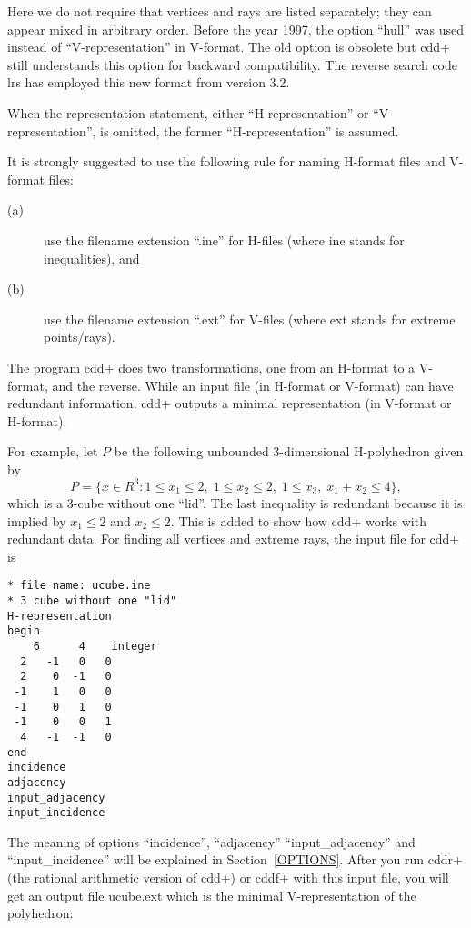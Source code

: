 \documentclass[11pt]{article}
\begin{document}
\bigskip
\noindent
Here we do not require that
vertices and rays are listed
separately; they can appear mixed in arbitrary
order.   Before the year 1997, 
the option ``hull'' was used instead of ``V-representation''
in V-format.  The old option is obsolete but cdd+ still
understands this option for backward compatibility.
The reverse search code lrs has employed this new format
from version 3.2.

When the representation statement, either ``H-representation''
or ``V-representation'', is omitted, the former
``H-representation'' is assumed.


It is strongly suggested to use the following rule for naming
H-format files and V-format files:   
\begin{description}
\item[(a)] use the filename  extension ``.ine'' for H-files (where ine stands for inequalities), and 
\item[(b)]  use the filename  extension ``.ext'' for V-files (where ext stands for extreme points/rays). 
\end{description}

The program cdd+ does two transformations, one from an H-format
to a V-format, and the reverse.    While an input file (in H-format or V-format)
can have redundant information, cdd+ outputs a minimal representation
(in V-format or H-format).

For example, let $P$ be the following unbounded 3-dimensional 
H-polyhedron given by
\[
   P = \{ x  \in R^3:
    1\le x_1 \le 2, \; 1 \le x_2 \le 2, \; 1 \le x_3,  \; x_1 + x_2 \le 4 \},
\]
which is a 3-cube without one ``lid''.   The last inequality is redundant
because it is implied by $x_1 \le 2$ and $x_2 \le 2$.  This is added
to show how cdd+ works with redundant data.
For finding all
vertices and extreme rays, the input file for cdd+ is

\begin{verbatim}
* file name: ucube.ine
* 3 cube without one "lid"
H-representation
begin
    6      4    integer
  2   -1   0   0
  2    0  -1   0
 -1    1   0   0
 -1    0   1   0
 -1    0   0   1
  4   -1  -1   0
end
incidence
adjacency
input_adjacency
input_incidence
\end{verbatim}

The meaning of options ``incidence'', ``adjacency''
``input\_adjacency'' and ``input\_incidence'' 
will be explained in Section~\ref{OPTIONS}.
After you run cddr+ (the rational arithmetic version of cdd+) or cddf+
with this input file, you will get
an output file ucube.ext  which is the minimal V-representation
of the polyhedron:
\end{document}
